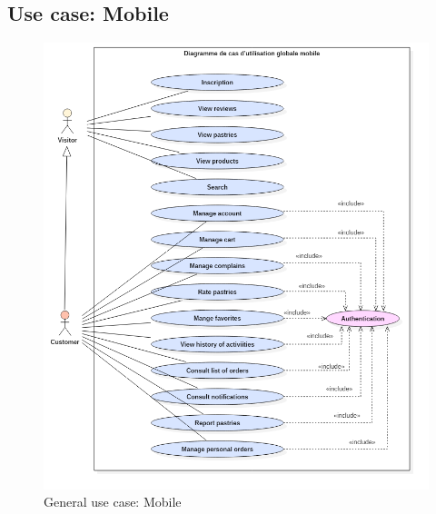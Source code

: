 \documentclass[12pt,a4paper]{report}
\begin{document}
	\subsection{Use case: Mobile}
	\begin{figure}[H]
		\centering
		\includegraphics[width=7in,keepaspectratio]{UseCasemobile.png}
		\caption{General use case: Mobile}
		\label{user-case-mobile}
	\end{figure}
\end{document}
